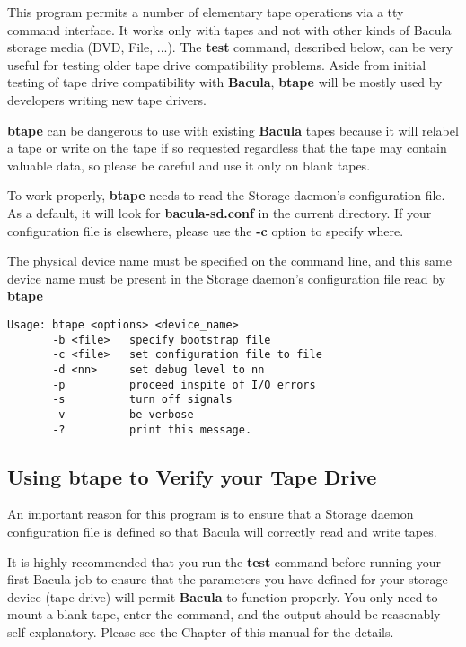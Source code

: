 This program permits a number of elementary tape operations via a tty command
interface. It works only with tapes and not with other kinds of Bacula
storage media (DVD, File, ...).  The {\bf test} command, described below,
can be very useful for testing older tape drive compatibility problems.
Aside from initial testing of tape drive compatibility with {\bf Bacula},
{\bf btape} will be mostly used by developers writing new tape drivers.

{\bf btape} can be dangerous to use with existing {\bf Bacula} tapes because
it will relabel a tape or write on the tape if so requested regardless that
the tape may contain valuable data, so please be careful and use it only on
blank tapes.

To work properly, {\bf btape} needs to read the Storage daemon's configuration
file. As a default, it will look for {\bf bacula-sd.conf} in the current
directory. If your configuration file is elsewhere, please use the {\bf -c}
option to specify where.

The physical device name must be specified on the command line, and this
same device name must be present in the Storage daemon's configuration file
read by {\bf btape}

\footnotesize
\begin{verbatim}
Usage: btape <options> <device_name>
       -b <file>   specify bootstrap file
       -c <file>   set configuration file to file
       -d <nn>     set debug level to nn
       -p          proceed inspite of I/O errors
       -s          turn off signals
       -v          be verbose
       -?          print this message.
\end{verbatim}
\normalsize

\subsection{Using btape to Verify your Tape Drive}

An important reason for this program is to ensure that a Storage daemon
configuration file is defined so that Bacula will correctly read and write
tapes.

It is highly recommended that you run the {\bf test} command before running
your first Bacula job to ensure that the parameters you have defined for your
storage device (tape drive) will permit {\bf Bacula} to function properly. You
only need to mount a blank tape, enter the command, and the output should be
reasonably self explanatory. Please see the
 Chapter of this manual for
the details.

